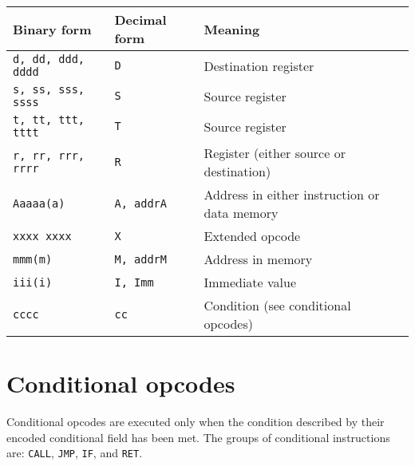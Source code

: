 \documentclass[oneside,english,a4paper,10pt,oneside,openany,final]{memoir}
\newcommand{\Opcode}[1]{\texttt{#1}}
\begin{document}
\begin{table}[H]
\centering
\begin{tabular}{|l|l|l|}
\hline
\textbf{Binary form}          & \textbf{Decimal form}          & \textbf{Meaning}                             \\ \hline
\texttt{d, dd, ddd, dddd}     & \texttt{D}                     & Destination register                         \\ \hline
\texttt{s, ss, sss, ssss}     & \texttt{S}                     & Source register                              \\ \hline
\texttt{t, tt, ttt, tttt}     & \texttt{T}                     & Source register                              \\ \hline
\texttt{r, rr, rrr, rrrr}     & \texttt{R}                     & Register (either source or destination)      \\ \hline
\texttt{Aaaaa(a)}             & \texttt{A, addrA}              & Address in either instruction or data memory \\ \hline
\texttt{xxxx xxxx}            & \texttt{X}                     & Extended opcode                              \\ \hline
\texttt{mmm(m)}               & \texttt{M, addrM}              & Address in memory                            \\ \hline
\texttt{iii(i)}               & \texttt{I, Imm}                & Immediate value                              \\ \hline
\texttt{cccc}                 & \texttt{cc}                    & Condition (see conditional opcodes)          \\ \hline
\end{tabular}
\end{table}

\pagebreak{}

\section{Conditional opcodes}

Conditional opcodes are executed only when the condition described by their encoded conditional field has been met.
The groups of conditional instructions are: \Opcode{CALL}, \Opcode{JMP}, \Opcode{IF}, and \Opcode{RET}.
\end{document}
